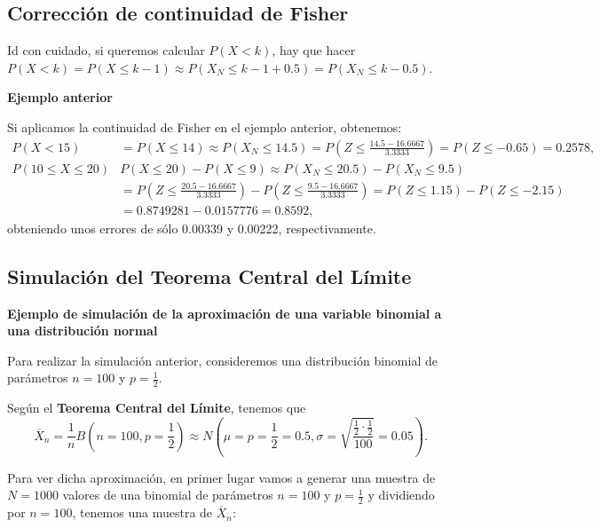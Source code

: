 \documentclass[]{book}
\begin{document}
\hypertarget{correcciuxf3n-de-continuidad-de-fisher-1}{%
\subsection{Corrección de continuidad de Fisher}\label{correcciuxf3n-de-continuidad-de-fisher-1}}

Id con cuidado, si queremos calcular \(P(X<k)\), hay que hacer \(P(X<k) =P(X\leq k-1)\approx P(X_N \leq k-1+0.5)=P(X_N\leq k-0.5)\).

\textbf{Ejemplo anterior}

Si aplicamos la continuidad de Fisher en el ejemplo anterior, obtenemos:
\[
\begin{array}{rl}
P(X< 15) & = P(X\leq 14) \approx P(X_N \leq 14.5)=P\left(Z\leq \frac{14.5-16.6667}{3.3333}\right) =P(Z\leq -0.65) = 0.2578,\\
P(10\leq X\leq 20) & P(X\leq 20)-P(X\leq 9)\approx P(X_N \leq 20.5)-P(X_N\leq 9.5) \\ & = P\left(Z\leq \frac{20.5-16.6667}{3.3333}\right) - P\left(Z\leq \frac{9.5-16.6667}{3.3333}\right)=  P(Z\leq 1.15)-P(Z\leq -2.15)\\ & =0.8749281-0.0157776 = 0.8592,
\end{array}
\]
obteniendo unos errores de sólo 0.00339 y 0.00222, respectivamente.

\hypertarget{simulaciuxf3n-del-teorema-central-del-luxedmite}{%
\subsection{Simulación del Teorema Central del Límite}\label{simulaciuxf3n-del-teorema-central-del-luxedmite}}

\textbf{Ejemplo de simulación de la aproximación de una variable binomial a una distribución normal}

Para realizar la simulación anterior, consideremos una distribución binomial de parámetros \(n=100\) y \(p=\frac{1}{2}\).

Según el \textbf{Teorema Central del Límite}, tenemos que
\[
\overline{X}_n=\frac{1}{n}B\left(n=100,p=\frac{1}{2}\right)\approx N\left(\mu = p=\frac{1}{2}=0.5,\sigma=\sqrt{\frac{\frac{1}{2}\cdot \frac{1}{2}}{100}}=0.05\right).
\]

Para ver dicha aproximación, en primer lugar vamos a generar una muestra de \(N=1000\) valores de una binomial de parámetros \(n=100\) y \(p=\frac{1}{2}\) y dividiendo por \(n=100\), tenemos una muestra de \(\overline{X}_n\):
\end{document}
